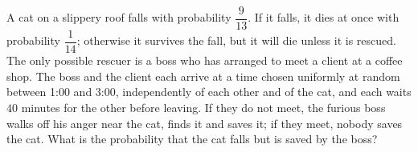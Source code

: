 A cat on a slippery roof falls with probability $\dfrac{9}{13}$. If it falls, it dies at once with probability $\dfrac{1}{14}$; otherwise it survives the fall, but it will die unless it is rescued. The only possible rescuer is a boss who has arranged to meet a client at a coffee shop. The boss and the client each arrive at a time chosen uniformly at random between 1:00 and 3:00, independently of each other and of the cat, and each waits $40$ minutes for the other before leaving. If they do not meet, the furious boss walks off his anger near the cat, finds it and saves it; if they meet, nobody saves the cat. What is the probability that the cat falls but is saved by the boss?
